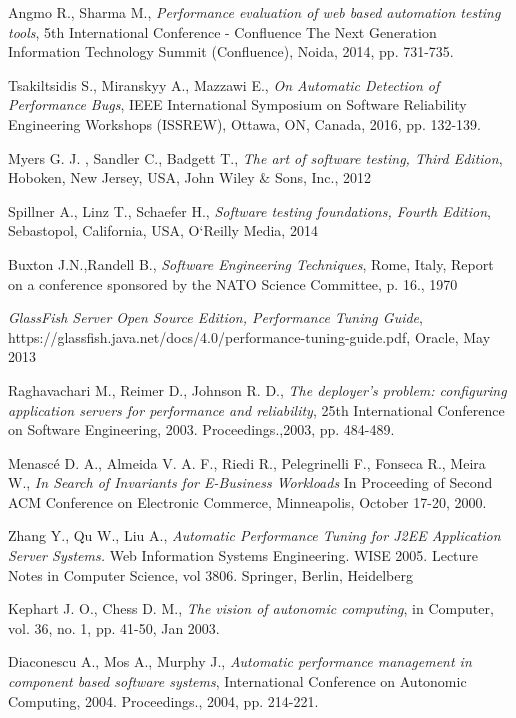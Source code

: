 \documentclass[10pt,a4paper]{article}
\begin{document}
\begin{thebibliography}{9}
Angmo R., Sharma M., 
\textit{Performance evaluation of web based automation testing tools}, 
5th International Conference - Confluence The Next Generation Information Technology Summit (Confluence), Noida, 2014, pp. 731-735.

Tsakiltsidis S., Miranskyy A., Mazzawi E., 
\textit{On Automatic Detection of Performance Bugs},
IEEE International Symposium on Software Reliability Engineering Workshops (ISSREW), Ottawa, ON, Canada, 2016, pp. 132-139.

Myers G. J. , Sandler C.,  Badgett T.,
\textit{The art of software testing, Third Edition},
Hoboken, New Jersey, USA, John Wiley \& Sons, Inc., 2012

Spillner A., Linz T., Schaefer H.,
\textit{Software testing foundations, Fourth Edition},
Sebastopol, California, USA, O‘Reilly Media, 2014

Buxton J.N.,Randell  B., 
\textit{Software Engineering Techniques}, 
Rome, Italy, Report on a conference sponsored by the NATO Science Committee, p. 16., 1970

\textit{GlassFish Server Open Source Edition, Performance Tuning Guide}, 
https://glassfish.java.net/docs/4.0/performance-tuning-guide.pdf,
Oracle, May 2013

Raghavachari M., Reimer D., Johnson R. D., 
\textit{The deployer's problem: configuring application servers for performance and reliability}, 
25th International Conference on Software Engineering, 2003. Proceedings.,2003, pp. 484-489.

Menascé D. A., Almeida V. A. F., Riedi R., Pelegrinelli F., Fonseca R., Meira W.,  
\textit{In Search of Invariants for E-Business Workloads} 
In Proceeding of Second ACM Conference on Electronic Commerce, Minneapolis, October 17-20, 2000. 

Zhang Y., Qu W., Liu A., 
\textit{Automatic Performance Tuning for J2EE Application Server Systems.}  Web Information Systems Engineering. WISE 2005. Lecture Notes in Computer Science, vol 3806. Springer, Berlin, Heidelberg

Kephart J. O., Chess D. M., 
\textit{The vision of autonomic computing}, in Computer, vol. 36, no. 1, pp. 41-50, Jan 2003.

Diaconescu A., Mos A., Murphy J., \textit{Automatic performance management in component based software systems}, International Conference on Autonomic Computing, 2004. Proceedings., 2004, pp. 214-221.


\end{thebibliography}
\end{document}
